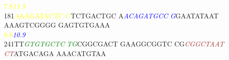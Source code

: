 \documentclass[11pt,twoside,reqno,a4paper]{article}
\begin{document}
{\hspace*{4\charwidth}\hspace*{1\charwidth}\hspace*{10\charwidth}\textcolor{yellow}{7.8}\hspace*{1\charwidth}\hspace*{1\charwidth}\hspace*{1\charwidth}\hspace*{28\charwidth}\textit{\textcolor{yellow}{11.9}}\hspace*{1\charwidth}\hspace*{1\charwidth}\\
181\hspace*{1\charwidth}\textit{\textcolor{yellow}{A}}\textcolor{yellow}{A}\textcolor{yellow}{A}\textcolor{yellow}{G}\textcolor{yellow}{A}\textcolor{yellow}{T}\textcolor{yellow}{A}\textcolor{yellow}{C}\textcolor{yellow}{T}\textcolor{yellow}{C}	\textcolor{yellow}{C}TCTGACTGC	A\textit{\textcolor{blue}{A}}\textit{\textcolor{blue}{C}}\textit{\textcolor{blue}{A}}\textit{\textcolor{blue}{G}}\textit{\textcolor{blue}{A}}\textit{\textcolor{blue}{T}}\textit{\textcolor{blue}{G}}\textit{\textcolor{blue}{C}}\textit{\textcolor{blue}{C}}	\textit{\textcolor{blue}{G}}GAATATAAT	AAAGTCGGGG	GAGTGTGAAA	\\
\hspace*{4\charwidth}\hspace*{1\charwidth}\textcolor{yellow}{8.8}\hspace*{1\charwidth}\hspace*{1\charwidth}\hspace*{17\charwidth}\textit{\textcolor{blue}{10.9}}\hspace*{1\charwidth}\hspace*{1\charwidth}\hspace*{1\charwidth}\hspace*{1\charwidth}\\
241\hspace*{1\charwidth}TT\textit{\textcolor{green}{G}}\textit{\textcolor{green}{T}}\textit{\textcolor{green}{G}}\textit{\textcolor{green}{T}}\textit{\textcolor{green}{G}}\textit{\textcolor{green}{C}}\textit{\textcolor{green}{T}}\textit{\textcolor{green}{C}}	\textit{\textcolor{green}{T}}\textit{\textcolor{green}{G}}CGGCGACT	GAAGGCGGTC	CG\textit{\textcolor{brown}{C}}\textit{\textcolor{brown}{G}}\textit{\textcolor{brown}{G}}\textit{\textcolor{brown}{C}}\textit{\textcolor{brown}{T}}\textit{\textcolor{brown}{A}}\textit{\textcolor{brown}{A}}\textit{\textcolor{brown}{T}}	\textit{\textcolor{brown}{C}}\textit{\textcolor{brown}{T}}ATGACAGA	AAACATGTAA	\\
}
\end{document}
